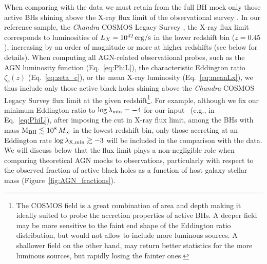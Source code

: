 When comparing with the data we must retain from the full BH mock only those active BHs shining above the X-ray flux limit of the observational survey \citep[e.g.,][]{Shankar13Acc}. In our reference sample, the \textit{Chandra} COSMOS Legacy Survey \citep[COSMOS-Legacy,][]{2016ApJ...819...62C}, the X-ray flux limit corresponds to luminosities of $L_X=10^{42}\, {\rm erg/s}$ in the lower redshift bin ($z=0.45$), increasing by an order of magnitude or more at higher redshifts (see below for details). When computing all AGN-related observational probes, such as the AGN luminosity function (Eq.~\ref{eq:PhiL}), the characteristic Eddington ratio $\zeta_c(z)$ (Eq.~\ref{eq:zeta_c}), or the mean X-ray luminosity (Eq.~\ref{eq:meanLx}), we thus include only those active black holes shining above the \textit{Chandra} COSMOS Legacy Survey flux limit at the given redshift{\footnote{The COSMOS field is a great combination of area and depth making it ideally suited to probe the accretion properties of active BHs. A deeper field may be more sensitive to the faint end shape of the Eddington ratio distribution, but would not allow to include more luminous sources. A shallower field on the other hand, may return better statistics for the more luminous sources, but rapidly losing the fainter ones.}}. For example, although we fix our minimum Eddington ratio to $\log \lambda_{\rm min}=-4$ for our input \PLz\ (e.g., in Eq.~\ref{eq:PhiL}), after imposing the cut in X-ray flux limit, among the BHs with mass ${\rm M}_{\rm BH} \lesssim 10^8\, M_{\odot}$ in the lowest redshift bin, only those accreting at an Eddington rate $\log \lambda_{\rm X, min} \gtrsim -3$ will be included in the comparison with the data. We will discuss below that the flux limit plays a non-negligible role when comparing theoretical AGN mocks to observations, particularly with respect to the observed fraction of active black holes as a function of host galaxy stellar mass (Figure~\ref{fig:AGN_fractions}).

